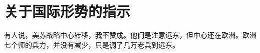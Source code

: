 \section[关于国际形势的指示（一九六七年五月）]{关于国际形势的指示}


有人说，美苏战略中心转移，我不赞成。他们是注意远东，但中心还在欧洲。欧洲七个师的兵力，并没有减少，只是调了几万老兵到远东。


